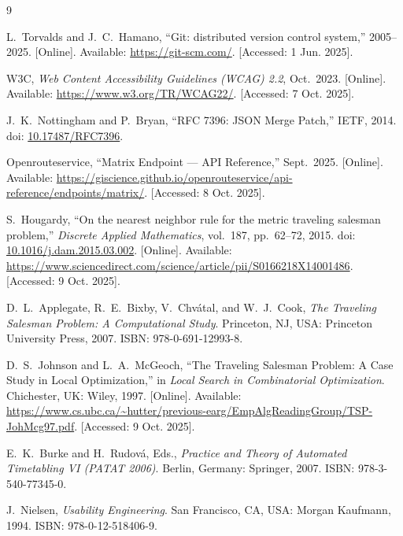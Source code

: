 \documentclass{article}
\begin{document}
\begin{thebibliography}{9}

L.~Torvalds and J.~C.~Hamano, ``Git: distributed version control system,'' 2005--2025.
[Online]. Available: \url{https://git-scm.com/}. [Accessed: 1 Jun. 2025].

W3C, \emph{Web Content Accessibility Guidelines (WCAG) 2.2}, Oct.\ 2023.
[Online]. Available: \url{https://www.w3.org/TR/WCAG22/}. [Accessed: 7 Oct. 2025].

J.~K.~Nottingham and P.~Bryan, ``RFC 7396: JSON Merge Patch,'' IETF, 2014.
doi: \href{https://doi.org/10.17487/RFC7396}{10.17487/RFC7396}.

Openrouteservice, ``Matrix Endpoint — API Reference,'' Sept.\ 2025.
[Online]. Available: \url{https://giscience.github.io/openrouteservice/api-reference/endpoints/matrix/}.
[Accessed: 8 Oct. 2025].

S.~Hougardy, ``On the nearest neighbor rule for the metric traveling salesman problem,''
\emph{Discrete Applied Mathematics}, vol.~187, pp.~62--72, 2015.
doi: \href{https://doi.org/10.1016/j.dam.2015.03.002}{10.1016/j.dam.2015.03.002}.
[Online]. Available: \url{https://www.sciencedirect.com/science/article/pii/S0166218X14001486}.
[Accessed: 9 Oct. 2025].

D.~L.~Applegate, R.~E.~Bixby, V.~Chv\'atal, and W.~J.~Cook,
\emph{The Traveling Salesman Problem: A Computational Study}.
Princeton, NJ, USA: Princeton University Press, 2007.
ISBN: 978-0-691-12993-8.

D.~S.~Johnson and L.~A.~McGeoch, ``The Traveling Salesman Problem: A Case Study in Local Optimization,''
in \emph{Local Search in Combinatorial Optimization}. Chichester, UK: Wiley, 1997.
[Online]. Available: \url{https://www.cs.ubc.ca/~hutter/previous-earg/EmpAlgReadingGroup/TSP-JohMcg97.pdf}.
[Accessed: 9 Oct. 2025].

E.~K.~Burke and H.~Rudov\'a, Eds., \emph{Practice and Theory of Automated Timetabling VI (PATAT 2006)}.
Berlin, Germany: Springer, 2007. ISBN: 978-3-540-77345-0.

J.~Nielsen, \emph{Usability Engineering}. San Francisco, CA, USA: Morgan Kaufmann, 1994.
ISBN: 978-0-12-518406-9.

\end{thebibliography}
\end{document}
